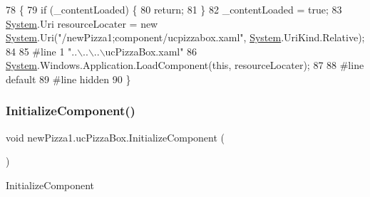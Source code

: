 \begin{DoxyCode}
78                                           \{
79             \textcolor{keywordflow}{if} (\_contentLoaded) \{
80                 \textcolor{keywordflow}{return};
81             \}
82             \_contentLoaded = \textcolor{keyword}{true};
83             \hyperlink{namespaceSystem}{System}.Uri resourceLocater = \textcolor{keyword}{new} \hyperlink{namespaceSystem}{System}.Uri(\textcolor{stringliteral}{"/newPizza1;component/ucpizzabox.xaml"},
       \hyperlink{namespaceSystem}{System}.UriKind.Relative);
84             
85 \textcolor{preprocessor}{            #line 1 "..\(\backslash\)..\(\backslash\)..\(\backslash\)ucPizzaBox.xaml"}
86             \hyperlink{namespaceSystem}{System}.Windows.Application.LoadComponent(\textcolor{keyword}{this}, resourceLocater);
87             
88 \textcolor{preprocessor}{            #line default}
89 \textcolor{preprocessor}{            #line hidden}
90         \}
\end{DoxyCode}
\mbox{\label{classnewPizza1_1_1ucPizzaBox_a0bf3486ff05489987fc9b6766aec72d1}} 
\subsubsection{\texorpdfstring{Initialize\+Component()}{InitializeComponent()}\hspace{0.1cm}{\footnotesize\ttfamily [5/6]}}
{\footnotesize\ttfamily void new\+Pizza1.\+uc\+Pizza\+Box.\+Initialize\+Component (\begin{DoxyParamCaption}{ }\end{DoxyParamCaption})\hspace{0.3cm}{\ttfamily [inline]}}



Initialize\+Component 


